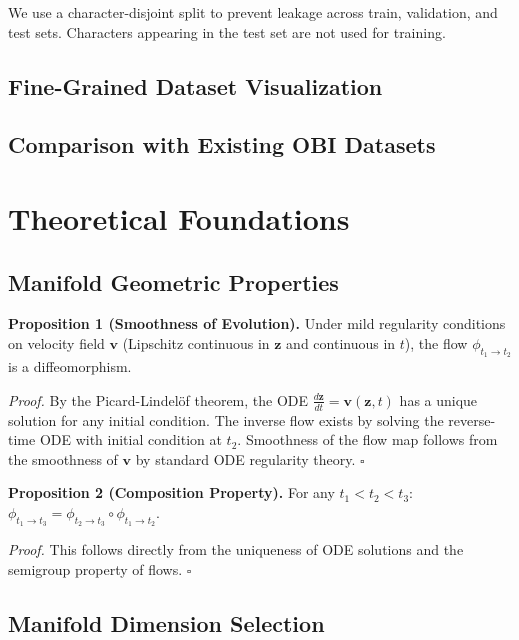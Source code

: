 \documentclass{article}
\begin{document}
We use a character-disjoint split to prevent leakage across train, validation, and test sets. 
Characters appearing in the test set are not used for training.

\subsection{Fine-Grained Dataset Visualization}
\label{app:fine_grained_vis_summary}


\subsection{Comparison with Existing OBI Datasets}
\label{app:dataset_comparison}


\section{Theoretical Foundations}
\label{app:theory}

\subsection{Manifold Geometric Properties}

\textbf{Proposition 1 (Smoothness of Evolution).} Under mild regularity conditions on velocity field $\mathbf{v}$ (Lipschitz continuous in $\mathbf{z}$ and continuous in $t$), the flow $\phi_{t_1 \to t_2}$ is a diffeomorphism.

\textit{Proof.} By the Picard-Lindelöf theorem, the ODE $\frac{d\mathbf{z}}{dt} = \mathbf{v}(\mathbf{z}, t)$ has a unique solution for any initial condition. The inverse flow exists by solving the reverse-time ODE with initial condition at $t_2$. Smoothness of the flow map follows from the smoothness of $\mathbf{v}$ by standard ODE regularity theory. \hfill $\square$

\textbf{Proposition 2 (Composition Property).} For any $t_1 < t_2 < t_3$: $\phi_{t_1 \to t_3} = \phi_{t_2 \to t_3} \circ \phi_{t_1 \to t_2}$.

\textit{Proof.} This follows directly from the uniqueness of ODE solutions and the semigroup property of flows. \hfill $\square$

\subsection{Manifold Dimension Selection}
\end{document}
